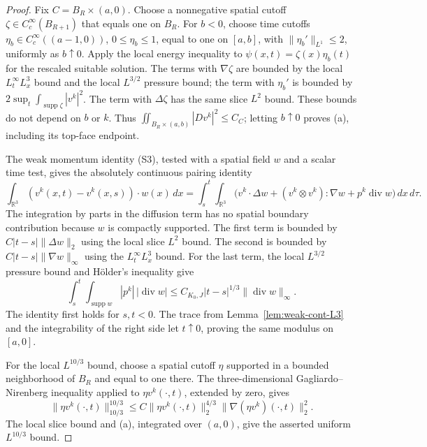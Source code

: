 \documentclass[11pt,letterpaper]{article}
\numberwithin{equation}{section}
\theoremstyle{plain}
\theoremstyle{definition}
\theoremstyle{remark}
\begin{document}
\begin{proof}
Fix \(C=B_R\times(a,0)\). Choose a nonnegative spatial cutoff \(\zeta\in C_c^\infty(B_{R+1})\) that equals one on \(B_R\). For \(b<0\), choose time cutoffs \(\eta_b\in C_c^\infty((a-1,0))\), \(0\le\eta_b\le1\), equal to one on \([a,b]\), with \(\|\eta_b'\|_{L^1}\le2\), uniformly as \(b\uparrow0\). Apply the local energy inequality to \(\psi(x,t)=\zeta(x)\eta_b(t)\) for the rescaled suitable solution. The terms with \(\nabla\zeta\) are bounded by the local \(L^\infty_tL^3_x\) bound and the local \(L^{3/2}\) pressure bound; the term with \(\eta_b'\) is bounded by \(2\sup_t\int_{\operatorname{supp}\zeta}|v^k|^2\). The term with \(\Delta\zeta\) has the same slice \(L^2\) bound. These bounds do not depend on \(b\) or \(k\). Thus \(\iint_{B_R\times(a,b)}|Dv^k|^2\le C_C\); letting \(b\uparrow0\) proves (a), including its top-face endpoint.

The weak momentum identity (S3), tested with a spatial field \(w\) and a scalar time test, gives the absolutely continuous pairing identity
\begin{equation*}
 \int_{\mathbb R^3}(v^k(x,t)-v^k(x,s))\cdot w(x)\,dx
 =\int_s^t\int_{\mathbb R^3}
 \bigl(v^k\cdot\Delta w+(v^k\otimes v^k):\nabla w
                         +p^k\operatorname{div}w\bigr)\,dx\,d\tau.
\end{equation*}
The integration by parts in the diffusion term has no spatial boundary contribution because \(w\) is compactly supported. The first term is bounded by \(C|t-s|\|\Delta w\|_2\) using the local slice \(L^2\) bound. The second is bounded by \(C|t-s|\|\nabla w\|_\infty\) using the \(L^\infty_tL^3_x\) bound. For the last term, the local \(L^{3/2}\) pressure bound and Hölder's inequality give
\begin{equation*}
 \int_s^t\int_{\operatorname{supp}w}|p^k|\,|\operatorname{div}w|
 \le C_{K_0,J}|t-s|^{1/3}\|\operatorname{div}w\|_\infty.
\end{equation*}
The identity first holds for \(s,t<0\). The trace from Lemma~\ref{lem:weak-cont-L3} and the integrability of the right side let \(t\uparrow0\), proving the same modulus on \([a,0]\).

For the local \(L^{10/3}\) bound, choose a spatial cutoff \(\eta\) supported in a bounded neighborhood of \(B_R\) and equal to one there. The three-dimensional Gagliardo--Nirenberg inequality applied to \(\eta v^k(\cdot,t)\), extended by zero, gives
\begin{equation*}
 \|\eta v^k(\cdot,t)\|_{10/3}^{10/3}
 \le C\|\eta v^k(\cdot,t)\|_2^{4/3}
       \|\nabla(\eta v^k)(\cdot,t)\|_2^2.
\end{equation*}
The local slice bound and (a), integrated over \((a,0)\), give the asserted uniform \(L^{10/3}\) bound.


\end{proof}
\end{document}
